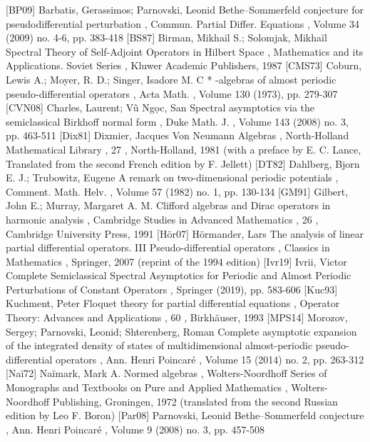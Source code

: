  [BP09] Barbatis, Gerassimos; Parnovski, Leonid Bethe–Sommerfeld conjecture for pseudodifferential perturbation , Commun. Partial Differ. Equations , Volume 34 (2009) no. 4-6, pp. 383-418
 [BS87] Birman, Mikhail S.; Solomjak, Mikhaĭl Spectral Theory of Self-Adjoint Operators in Hilbert Space , Mathematics and its Applications. Soviet Series , Kluwer Academic Publishers, 1987
 [CMS73] Coburn, Lewis A.; Moyer, R. D.; Singer, Isadore M. C * -algebras of almost periodic pseudo-differential operators , Acta Math. , Volume 130 (1973), pp. 279-307
 [CVN08] Charles, Laurent; Vũ Ngọc, San Spectral asymptotics via the semiclassical Birkhoff normal form , Duke Math. J. , Volume 143 (2008) no. 3, pp. 463-511
 [Dix81] Dixmier, Jacques Von Neumann Algebras , North-Holland Mathematical Library , 27 , North-Holland, 1981 (with a preface by E. C. Lance, Translated from the second French edition by F. Jellett)
 [DT82] Dahlberg, Bjorn E. J.; Trubowitz, Eugene A remark on two-dimensional periodic potentials , Comment. Math. Helv. , Volume 57 (1982) no. 1, pp. 130-134
 [GM91] Gilbert, John E.; Murray, Margaret A. M. Clifford algebras and Dirac operators in harmonic analysis , Cambridge Studies in Advanced Mathematics , 26 , Cambridge University Press, 1991
 [Hör07] Hörmander, Lars The analysis of linear partial differential operators. III Pseudo-differential operators , Classics in Mathematics , Springer, 2007 (reprint of the 1994 edition)
 [Ivr19] Ivrii, Victor Complete Semiclassical Spectral Asymptotics for Periodic and Almost Periodic Perturbations of Constant Operators , Springer (2019), pp. 583-606
 [Kuc93] Kuchment, Peter Floquet theory for partial differential equations , Operator Theory: Advances and Applications , 60 , Birkhäuser, 1993
 [MPS14] Morozov, Sergey; Parnovski, Leonid; Shterenberg, Roman Complete asymptotic expansion of the integrated density of states of multidimensional almost-periodic pseudo-differential operators , Ann. Henri Poincaré , Volume 15 (2014) no. 2, pp. 263-312
 [Naĭ72] Naĭmark, Mark A. Normed algebras , Wolters-Noordhoff Series of Monographs and Textbooks on Pure and Applied Mathematics , Wolters-Noordhoff Publishing, Groningen, 1972 (translated from the second Russian edition by Leo F. Boron)
 [Par08] Parnovski, Leonid Bethe–Sommerfeld conjecture , Ann. Henri Poincaré , Volume 9 (2008) no. 3, pp. 457-508

